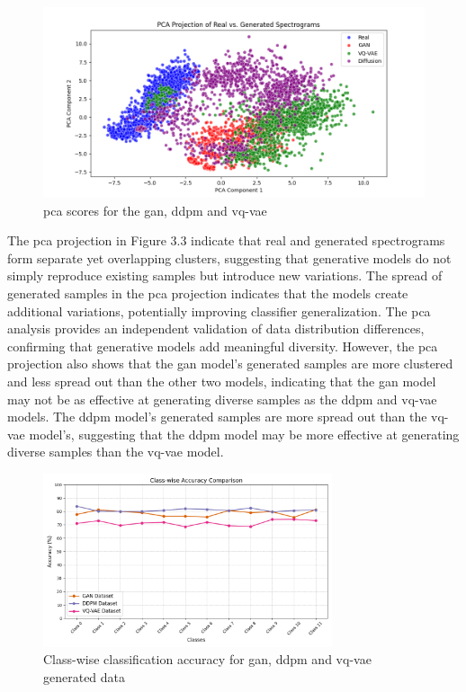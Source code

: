 \begin{figure}[h]
\includegraphics[width=\textwidth]{figures/PCA (1).png}
\centering
\caption{ \gls{pca} scores for the \gls{gan}, \gls{ddpm} and \gls{vq-vae}}
\centering
\end{figure}
The \gls{pca} projection in Figure 3.3 indicate that real and generated spectrograms form separate yet overlapping clusters, suggesting that generative models do not simply reproduce existing samples but introduce new variations. The spread of generated samples in the \gls{pca} projection indicates that the models create additional variations, potentially improving classifier generalization. The \gls{pca} analysis provides an independent validation of data distribution differences, confirming that generative models add meaningful diversity.
However, the \gls{pca} projection also shows that the \gls{gan} model's generated samples are more clustered and less spread out than the other two models, indicating that the \gls{gan} model may not be as effective at generating diverse samples as the \gls{ddpm} and \gls{vq-vae} models. The \gls{ddpm} model's generated samples are more spread out than the \gls{vq-vae} model's, suggesting that the \gls{ddpm} model may be more effective at generating diverse samples than the \gls{vq-vae} model.


\begin{figure}[t]
    \includegraphics[width=8.5cm]{figures/Figure_20 (1).png}
    \centering
    \caption{Class-wise classification accuracy for \gls{gan}, \gls{ddpm} and \gls{vq-vae} generated data}
    \centering
    \end{figure}
    
